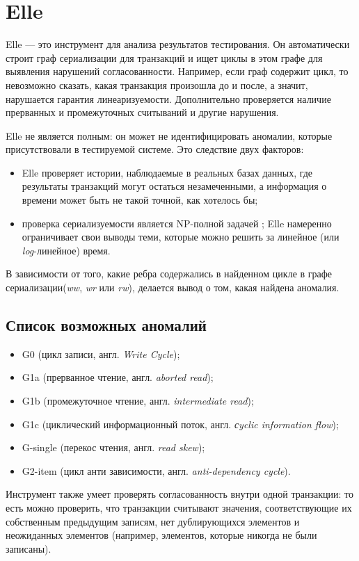 \documentclass[12pt,  openany]{book}
\begin{document}
\section{Elle}
Elle --- это инструмент для анализа результатов тестирования. Он автоматически строит граф сериализации для транзакций и ищет циклы в этом графе для выявления нарушений согласованности. Например, если граф содержит цикл, то невозможно сказать, какая транзакция произошла до и после, а значит, нарушается гарантия линеаризуемости.  
Дополнительно проверяется наличие прерванных и промежуточных считываний и другие нарушения.
\par Elle не является полным: он может не идентифицировать аномалии, которые присутствовали в тестируемой системе. Это следствие двух факторов:
\begin{itemize}
\item Elle проверяет истории, наблюдаемые в реальных базах данных, где результаты транзакций могут остаться незамеченными, а информация о времени может быть не такой точной, как хотелось бы;
\item проверка сериализуемости является NP-полной задачей \cite{NP_Serializability}; Elle намеренно ограничивает свои выводы теми, которые можно решить за линейное (или \textit{log}-линейное) время.  
\end{itemize}
В зависимости от того, какие ребра содержались в найденном цикле в графе сериализации(\textit{ww}, \textit{wr} или \textit{rw}), делается вывод о том, какая найдена аномалия.
\subsection{Список возможных аномалий}
\begin{itemize}
\item G0 (цикл записи, англ. \textit{Write Cycle}); 
\item G1a (прерванное чтение, англ. \textit{aborted read});
\item G1b (промежуточное чтение, англ. \textit{intermediate read});
\item G1c (циклический информационный поток, англ. \textit{сyclic information flow});
\item G-single (перекос чтения, англ. \textit{read skew});
\item G2-item (цикл анти зависимости, англ.  \textit{anti-dependency cycle}).
\end{itemize}
\par Инструмент также умеет проверять согласованность внутри одной транзакции: то есть можно проверить, что транзакции считывают значения, соответствующие их собственным предыдущим записям, нет дублирующихся элементов и неожиданных элементов (например, элементов, которые никогда не были записаны).
\end{document}
